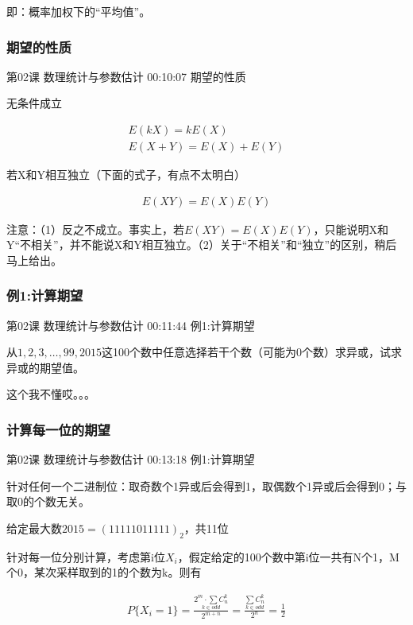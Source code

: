 \documentclass[UTF8]{ctexart}
\begin{document}
即：概率加权下的“平均值”。

\subsubsection{期望的性质}

第02课 数理统计与参数估计 00:10:07 期望的性质

无条件成立

\begin{equation}
\begin{aligned}
E(kX)=kE(X) \\
E(X+Y)=E(X)+E(Y)
\end{aligned}
\end{equation}

若X和Y相互独立（下面的式子，有点不太明白）

\begin{equation}
\begin{aligned}
E(XY)=E(X)E(Y)
\end{aligned}
\end{equation}

注意：（1）反之不成立。事实上，若$E(XY)=E(X)E(Y)$，只能说明X和Y“不相关”，并不能说X和Y相互独立。（2）关于“不相关”和“独立”的区别，稍后马上给出。

\subsubsection{例1:计算期望}

第02课 数理统计与参数估计 00:11:44 例1:计算期望

从$1,2,3,\dots,99,2015$这100个数中任意选择若干个数（可能为0个数）求异或，试求异或的期望值。

这个我不懂哎。。。

\subsubsection{计算每一位的期望}

第02课 数理统计与参数估计 00:13:18 例1:计算期望

针对任何一个二进制位：取奇数个1异或后会得到1，取偶数个1异或后会得到0；与取0的个数无关。

给定最大数$2015=(11111011111)_{2}$，共11位

针对每一位分别计算，考虑第i位$X_{i}$，假定给定的100个数中第i位一共有N个1，M个0，某次采样取到的1的个数为k。则有

\begin{equation}
\begin{aligned}
P\{X_{i}=1\}=\frac{\underset{k \in odd}{2^{m} \cdot \sum C_{n}^{k}}}{2^{m+n}}
=\frac{\underset{k \in odd}{\sum C_{n}^{k}}}{2^{n}}
=\frac{1}{2}
\end{aligned}
\end{equation}
\end{document}
